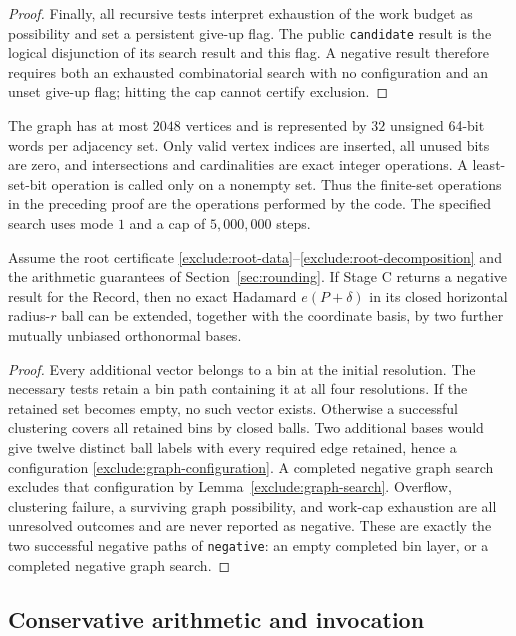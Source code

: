 \begin{proof}
Finally, all recursive tests interpret exhaustion of the work budget
as possibility and set a persistent give-up flag.  The public
\texttt{candidate} result is the logical disjunction of its search
result and this flag.  A negative result therefore requires both
an exhausted combinatorial search with no configuration and an unset
give-up flag; hitting the cap cannot certify exclusion.
\end{proof}

The graph has at most $2048$ vertices and is represented by $32$
unsigned 64-bit words per adjacency set.  Only valid vertex indices
are inserted, all unused bits are zero, and intersections and
cardinalities are exact integer operations.  A least-set-bit operation
is called only on a nonempty set.  Thus the finite-set operations in
the preceding proof are the operations performed by the code.
The specified search uses mode $1$ and a cap of $5{,}000{,}000$ steps.

\begin{proposition}
\label{exclude:local-certificate}
Assume the root certificate
\eqref{exclude:root-data}--\eqref{exclude:root-decomposition} and the
arithmetic guarantees of Section~\ref{sec:rounding}.
If Stage C returns a negative result for the Record, then no exact
Hadamard $e(P+\delta)$ in its closed horizontal radius-$r$ ball can
be extended, together with the coordinate basis, by two further
mutually unbiased orthonormal bases.
\end{proposition}
\begin{proof}
Every additional vector belongs to a bin at the initial resolution.
The necessary tests retain a bin path containing it at all four
resolutions.  If the retained set becomes empty, no such vector
exists.  Otherwise a successful clustering covers all retained bins
by closed balls.  Two additional bases would give twelve distinct
ball labels with every required edge retained, hence a configuration
\eqref{exclude:graph-configuration}.  A completed negative graph
search excludes that configuration by
Lemma~\ref{exclude:graph-search}.
Overflow, clustering failure, a surviving graph possibility, and
work-cap exhaustion are all unresolved outcomes and are never
reported as negative.  These are exactly the two successful negative
paths of \texttt{negative}: an empty completed bin layer, or a
completed negative graph search.
\end{proof}

\subsection{Conservative arithmetic and invocation}
\label{exclude:implementation}

